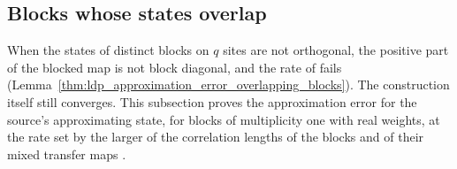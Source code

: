 
\subsection{Blocks whose states overlap}\label{sec:ldp_overlapping_blocks}

When the states of distinct blocks on $q$ sites are not orthogonal, the positive
part of the blocked map is not block diagonal, and the rate of
\cite[Lemma~1$'$(ii)]{Malz2024Preparation} fails
(Lemma~\ref{thm:ldp_approximation_error_overlapping_blocks}). The construction
itself still converges. This subsection proves the approximation error for the
source's approximating state, for blocks of multiplicity one with real weights, at the
rate set by the larger of the correlation lengths of the blocks and of their mixed
transfer maps \cite{gap:mswc24_block_form_mixed_overlap}.

